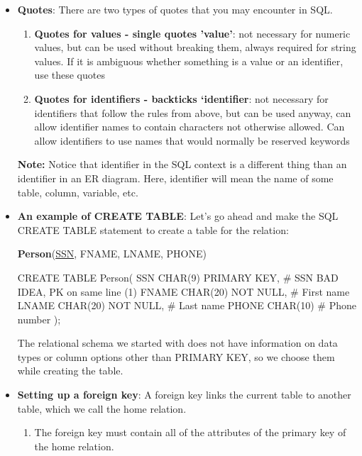 \documentclass{report}
\begin{document}
\begin{itemize}
\begin{enumerate}
            \end{enumerate}
        \item \textbf{Quotes}: There are two types of quotes that you may encounter in SQL.
            \begin{enumerate}
                \item \textbf{Quotes for values - single quotes 'value'}: not necessary for numeric values, but can be used without breaking them, always required for string values. If it is ambiguous whether something is a value or an identifier, use these quotes
                \item \textbf{Quotes for identifiers - backticks `identifier}: not necessary for identifiers that follow the rules from above, but can be used anyway, can allow identifier names to contain characters not otherwise allowed.  Can allow identifiers to use names that would normally be reserved keywords
            \end{enumerate}
            \bigbreak \noindent 
            \textbf{Note:} Notice that identifier in the SQL context is a different thing than an identifier in an ER diagram. Here, identifier will mean the name of some table, column, variable, etc.
        \item \textbf{An example of CREATE TABLE}: Let's go ahead and make the SQL CREATE TABLE statement to create a table for the relation:
            \begin{center}
                \textbf{Person}(\underline{SSN}, FNAME, LNAME, PHONE)
            \end{center}
            \bigbreak \noindent 
            \begin{sqlcode}
                CREATE TABLE Person(
                    SSN CHAR(9) PRIMARY KEY, # SSN BAD IDEA, PK on same line (1)
                    FNAME CHAR(20) NOT NULL, # First name
                    LNAME CHAR(20) NOT NULL, # Last name
                    PHONE CHAR(10) # Phone number
                ); 
            \end{sqlcode}
            \bigbreak \noindent 
            The relational schema we started with does not have information on data types or column options other than PRIMARY KEY, so we choose them while creating the table.
        \item \textbf{Setting up a foreign key}: A foreign key links the current table to another table, which we call the home relation.
            \begin{enumerate}
                \item The foreign key must contain all of the attributes of the primary key of the home relation.

\end{enumerate}
\end{itemize}
\end{document}
